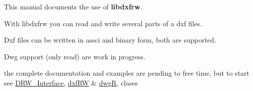 This manual documents the use of {\bfseries libdxfrw}.

With libdxfrw you can read and write several parts of a dxf files.

Dxf files can be written in assci and binary form, both are supported.

Dwg support (only read) are work in progress.

the complete documentation and examples are pending to free time, but to start see \hyperlink{class_d_r_w___interface}{D\+R\+W\+\_\+\+Interface}, \hyperlink{classdxf_r_w}{dxf\+R\+W} \& \hyperlink{classdwg_r}{dwg\+R}, clases 